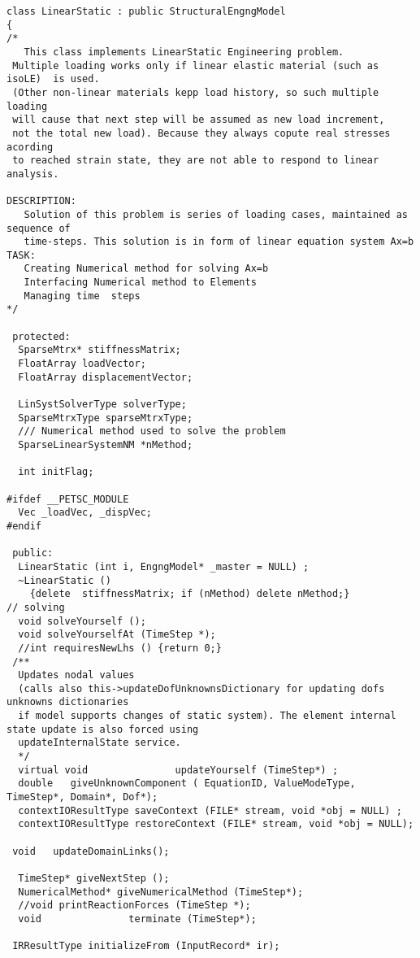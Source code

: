 \documentclass[12pt,draft]{article}
\begin{document}
{\small\begin{verbatim}
class LinearStatic : public StructuralEngngModel
{ 
/*
   This class implements LinearStatic Engineering problem.
 Multiple loading works only if linear elastic material (such as isoLE)  is used.
 (Other non-linear materials kepp load history, so such multiple loading
 will cause that next step will be assumed as new load increment, 
 not the total new load). Because they always copute real stresses acording
 to reached strain state, they are not able to respond to linear analysis.
  
DESCRIPTION:
   Solution of this problem is series of loading cases, maintained as sequence of
   time-steps. This solution is in form of linear equation system Ax=b
TASK:
   Creating Numerical method for solving Ax=b
   Interfacing Numerical method to Elements
   Managing time  steps
*/

 protected:
  SparseMtrx* stiffnessMatrix;
  FloatArray loadVector;
  FloatArray displacementVector;
  
  LinSystSolverType solverType;
  SparseMtrxType sparseMtrxType;
  /// Numerical method used to solve the problem
  SparseLinearSystemNM *nMethod;

  int initFlag;

#ifdef __PETSC_MODULE
  Vec _loadVec, _dispVec;
#endif

 public:
  LinearStatic (int i, EngngModel* _master = NULL) ;
  ~LinearStatic () 
    {delete  stiffnessMatrix; if (nMethod) delete nMethod;}
// solving
  void solveYourself ();
  void solveYourselfAt (TimeStep *);
  //int requiresNewLhs () {return 0;}
 /**
  Updates nodal values
  (calls also this->updateDofUnknownsDictionary for updating dofs unknowns dictionaries
  if model supports changes of static system). The element internal state update is also forced using
  updateInternalState service.
  */
  virtual void               updateYourself (TimeStep*) ;
  double   giveUnknownComponent ( EquationID, ValueModeType, TimeStep*, Domain*, Dof*);
  contextIOResultType saveContext (FILE* stream, void *obj = NULL) ;
  contextIOResultType restoreContext (FILE* stream, void *obj = NULL);

 void   updateDomainLinks();

  TimeStep* giveNextStep ();
  NumericalMethod* giveNumericalMethod (TimeStep*);
  //void printReactionForces (TimeStep *);
  void               terminate (TimeStep*);

 IRResultType initializeFrom (InputRecord* ir);


\end{verbatim}}
\end{document}
